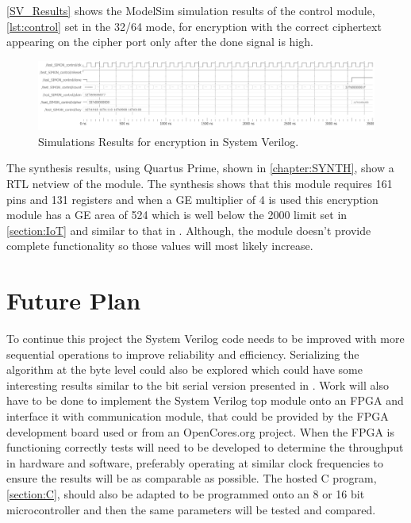 \documentclass[12pt,twoside,a4paper]{report}
\begin{document}
    \autoref{SV_Results} shows the ModelSim simulation results of the control module, \autoref{lst:control} set in the 32/64 mode, for encryption with the correct ciphertext appearing on the cipher port only after the done signal is high.
    
    \begin{figure}[H]
        \includegraphics[width=\textwidth]{ENCRYPT}
        \centering
        \caption{Simulations Results for encryption in System Verilog.}
    \label{SV_Results}
    \end{figure}
    
    The synthesis results, using Quartus Prime, shown in \autoref{chapter:SYNTH}, show a RTL netview of the module. The synthesis shows that this module requires 161 pins and 131 registers and when a GE multiplier of 4 is used this encryption module has a GE area of 524 which is well below the 2000 limit set in \autoref{section:IoT} and similar to that in \cite{Beaulieu2013}. Although, the module doesn't provide complete functionality so those values will most likely increase.
    
    \chapter{Future Plan}
    To continue this project the System Verilog code needs to be improved with more sequential operations to improve reliability and efficiency. Serializing the algorithm at the byte level could also be explored which could have some interesting results similar to the bit serial version presented in \cite{Vasquez2015}. Work will also have to be done to implement the System Verilog top module onto an FPGA and interface it with communication module, that could be provided by the FPGA development board used or from an OpenCores.org project\cite{Ope}. When the FPGA is functioning correctly tests will need to be developed to determine the throughput in hardware and software, preferably operating at similar clock frequencies to ensure the results will be as comparable as possible. The hosted C program, \autoref{section:C}, should also be adapted to be programmed onto an 8 or 16 bit microcontroller and then the same parameters will be tested and compared.
    
\end{document}
